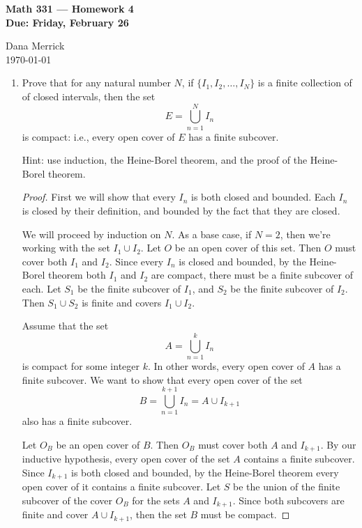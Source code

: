 \documentclass[12pt]{amsart}
\begin{document}
\thispagestyle{empty}

\begin{center}
{\bf Math 331  --- Homework 4 \\
Due:  Friday, February 26}
\end{center}

\bigskip

\noindent
Dana Merrick \\
\today

\bigskip

\begin{enumerate}

\setlength{\itemsep}{6pt}

\item Prove that for any natural number $N$, if $\{ I_1,I_2,\ldots,I_N\}$
  is a finite collection of of closed intervals, then the set
%
\[ E = \bigcup_{n=1}^N I_n \]
%
is compact:  i.e., every open cover of $E$ has a finite subcover.

Hint:  use induction, the Heine-Borel theorem, and the proof of the
Heine-Borel theorem.

\begin{proof}
First we will show that every $I_n$ is both closed and bounded. Each $I_n$ is closed by their definition, and bounded by the fact that they are closed.


We will proceed by induction on $N$. As a base case, if $N=2$, then we're working with the set $I_1\cup I_2$. Let $O$ be an open cover of this set. Then $O$ must cover both $I_1$ and $I_2$. Since every $I_n$ is closed and bounded, by the Heine-Borel theorem both $I_1$ and $I_2$ are compact, there must be a finite subcover of each. Let $S_1$ be the finite subcover of $I_1$, and $S_2$ be the finite subcover of $I_2$. Then $S_1\cup S_2$ is finite and covers $I_1\cup I_2$.

Assume that the set
\[ A = \bigcup_{n=1}^k I_n \]
is compact for some integer $k$. In other words, every open cover of $A$ has a finite subcover. We want to show that every open cover of the set
\[ B = \bigcup_{n=1}^{k+1} I_n = A \cup I_{k+1} \]
also has a finite subcover.

Let $O_B$ be an open cover of $B$. Then $O_B$ must cover both $A$ and $I_{k+1}$. By our inductive hypothesis, every open cover of the set $A$ contains a finite subcover. Since $I_{k+1}$ is both closed and bounded, by the Heine-Borel theorem every open cover of it contains a finite subcover. Let $S$ be the union of the finite subcover of the cover $O_B$ for the sets $A$ and $I_{k+1}$. Since both subcovers are finite and cover $A \cup I_{k+1}$, then the set $B$ must be compact.


\end{proof}
\end{enumerate}
\end{document}
